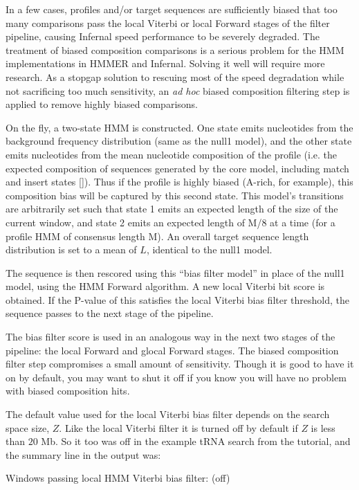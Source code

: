 \begin{sreoutput}
In a few cases, profiles and/or target sequences are sufficiently
biased that too many comparisons pass the local Viterbi or local
Forward stages of the filter pipeline, causing Infernal speed
performance to be severely degraded.  The treatment of biased
composition comparisons is a serious problem for the HMM
implementations in HMMER and Infernal. Solving it well will require
more research. As a stopgap solution to rescuing most of the speed
degradation while not sacrificing too much sensitivity, an \emph{ad
hoc} biased composition filtering step is applied to remove highly
biased comparisons.

On the fly, a two-state HMM is constructed. One state emits nucleotides
from the background frequency distribution (same as the null1 model),
and the other state emits nucleotides from the mean nucleotide composition
of the profile (i.e. the expected composition of sequences generated
by the core model, including match and insert states
[]). Thus if the profile is
highly biased (A-rich, for example), this composition bias will be captured
by this second state. This model's transitions are arbitrarily set
such that state 1 emits an expected length of the size of the current
window, and state
2 emits an expected length of M/8 at a time (for a profile HMM of
consensus length
M). An overall target sequence length distribution is set to a mean of
$L$, identical to the null1 model.

The sequence is then rescored using this ``bias filter model'' in
place of the null1 model, using the HMM Forward algorithm.  A new
local Viterbi bit score is obtained. If the P-value of this satisfies
the local Viterbi bias filter threshold, the sequence passes to the
next stage of the pipeline.

The bias filter score is used in an analogous way in the next two
stages of the pipeline: the local Forward and glocal Forward stages.
The biased composition filter step compromises a small amount of
sensitivity.  Though it is good to have it on by default, you may want
to shut it off if you know you will have no problem with biased
composition hits.

The default value used for the local Viterbi bias filter depends on
the search space size, $Z$. Like the local Viterbi filter it is turned
off by default if $Z$ is less than $20$ Mb. So it too was off in the
example tRNA search from the tutorial, and the summary line in the
output was:

\begin{sreoutput}
Windows   passing  local HMM Viterbi  bias filter:                  (off)
\end{sreoutput}


\end{sreoutput}
